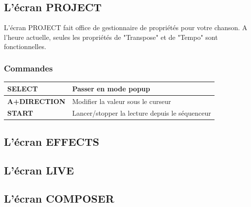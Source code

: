 \documentclass[12pt,a4paper]{article}
\begin{document}
    \subsection{L'écran PROJECT}
    
    L'écran PROJECT fait office de gestionnaire de propriétés pour votre chanson. A l'heure actuelle, seules les propriétés de "Transpose" et de "Tempo" sont fonctionnelles.
    
    
        \subsubsection{Commandes}        
        \tablelasttail{\hline}
        \begin{supertabular}{|l|p{11cm}|}
        \hline
            {\bf SELECT} & Passer en mode popup \\
            \hline
            {\bf A+DIRECTION} & Modifier la valeur sous le curseur \\
            \hline
            {\bf START} & Lancer/stopper la lecture depuis le séquenceur \\ 
        \hline
        \end{supertabular}
    
    \subsection{L'écran EFFECTS}
    
    
    \subsection{L'écran LIVE}
    
    
    \subsection{L'écran COMPOSER}  
    
\end{document}
